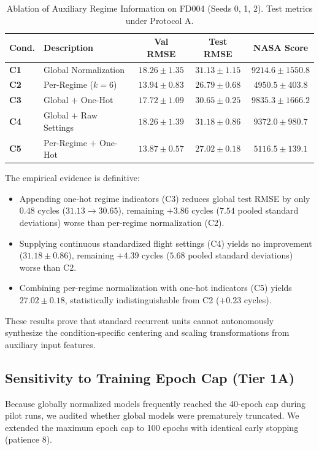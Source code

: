 \documentclass[conference]{IEEEtran}
\begin{document}
\begin{table}[t]
\caption{Ablation of Auxiliary Regime Information on FD004 (Seeds 0, 1, 2). Test metrics under Protocol A.}
\label{tab:e1_summary}
\centering
\begin{tabular}{llccc}
\toprule
Cond. & Description & Val RMSE & Test RMSE & NASA Score \\
\midrule
\textbf{C1} & Global Normalization & $18.26 \pm 1.35$ & $31.13 \pm 1.15$ & $9214.6 \pm 1550.8$ \\
\textbf{C2} & Per-Regime ($k=6$) & $\mathbf{13.94 \pm 0.83}$ & $\mathbf{26.79 \pm 0.68}$ & $\mathbf{4950.5 \pm 403.8}$ \\
\textbf{C3} & Global $+$ One-Hot & $17.72 \pm 1.09$ & $30.65 \pm 0.25$ & $9835.3 \pm 1666.2$ \\
\textbf{C4} & Global $+$ Raw Settings & $18.26 \pm 1.39$ & $31.18 \pm 0.86$ & $9372.0 \pm 980.7$ \\
\textbf{C5} & Per-Regime $+$ One-Hot & $13.87 \pm 0.57$ & $27.02 \pm 0.18$ & $5116.5 \pm 139.1$ \\
\bottomrule
\end{tabular}
\end{table}

The empirical evidence is definitive:
\begin{itemize}
    \item Appending one-hot regime indicators (C3) reduces global test RMSE by only $0.48$ cycles ($31.13 \to 30.65$), remaining $+3.86$ cycles ($7.54$ pooled standard deviations) worse than per-regime normalization (C2).
    \item Supplying continuous standardized flight settings (C4) yields no improvement ($31.18 \pm 0.86$), remaining $+4.39$ cycles ($5.68$ pooled standard deviations) worse than C2.
    \item Combining per-regime normalization with one-hot indicators (C5) yields $27.02 \pm 0.18$, statistically indistinguishable from C2 ($+0.23$ cycles).
\end{itemize}
These results prove that standard recurrent units cannot autonomously synthesize the condition-specific centering and scaling transformations from auxiliary input features.

\subsection{Sensitivity to Training Epoch Cap (Tier 1A)}
Because globally normalized models frequently reached the 40-epoch cap during pilot runs, we audited whether global models were prematurely truncated. We extended the maximum epoch cap to 100 epochs with identical early stopping (patience 8).
\end{document}
